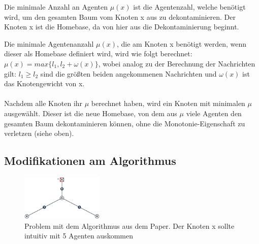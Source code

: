 \begin{mydef}
	Die minimale Anzahl an Agenten $\mu(x)$ ist die Agentenzahl, welche benötigt wird, um den gesamten Baum vom Knoten x aus zu dekontaminieren. Der Knoten x ist die Homebase, da von hier aus die Dekontaminierung beginnt.
\end{mydef}

Die minimale Agentenanzahl $\mu(x)$, die am Knoten x benötigt werden, wenn dieser als Homebase definiert wird, wird wie folgt berechnet:
\\
$\mu(x) = max\{l_{1},  l_{2} + \omega(x)\}$, wobei analog zu der Berechnung der Nachrichten gilt: $l_{1} \ge l_{2}$ sind die größten beiden angekommenen Nachrichten und $\omega(x)$ ist das Knotengewicht von x.
\\
\\
Nachdem alle Knoten ihr $\mu$ berechnet haben, wird ein Knoten mit minimalen $\mu$ ausgewählt. Dieser ist die neue Homebase, von dem aus $\mu$ viele Agenten den gesamten Baum dekontaminieren können, ohne die Monotonie-Eigenschaft zu verletzen (siehe oben).

\newpage

\subsection{Modifikationen am Algorithmus}\label{modifizierterAlgoChapter}


	\begin{figure}
		\begin{center}
			\includegraphics[width=0.35\textwidth]{bilder/abb_paper_problem.png}
		\end{center}
		\caption{Problem mit dem Algorithmus aus dem Paper. Der Knoten x sollte intuitiv mit 5 Agenten auskommen}
		\label{fig:negBeispielPaperAlgo}
	\end{figure}

